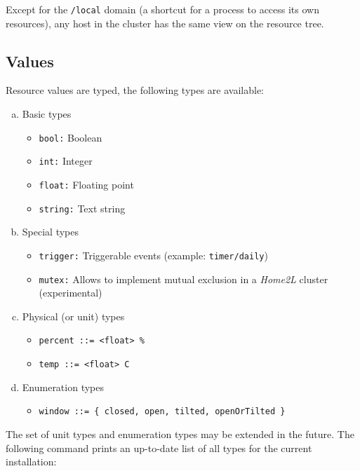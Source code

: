 \documentclass[12pt,english,parskip=half]{scrreprt}
\begin{document}
Except for the \texttt{/local} domain (a shortcut for a process to
access its own resources), any host in the cluster has the same view on
the resource tree.



\subsection{Values}

Resource values are typed, the following types are available:

\begin{enumerate}[a)]

\item Basic types
  \begin{itemize}
    \item \texttt{bool:} Boolean
    \item \texttt{int:} Integer
    \item \texttt{float:} Floating point
    \item \texttt{string:} Text string
  \end{itemize}

\item Special types
  \begin{itemize}
    \item \texttt{trigger:}  Triggerable events (example: \texttt{timer/daily})
    \item \texttt{mutex:} Allows to implement mutual exclusion in a \emph{Home2L} cluster (experimental)
  \end{itemize}

\item Physical (or unit) types
  \begin{itemize}
    \item \texttt{percent ::= <float> \%}
    \item \texttt{temp ::= <float> \textdegree C}
  \end{itemize}

\item Enumeration types
  \begin{itemize}
    \item \texttt{window ::= \{ closed, open, tilted, openOrTilted \}}
  \end{itemize}

\end{enumerate}

The set of unit types and enumeration types may be extended in the future.
The following command prints an up-to-date list of all types for the current installation:
\end{document}
